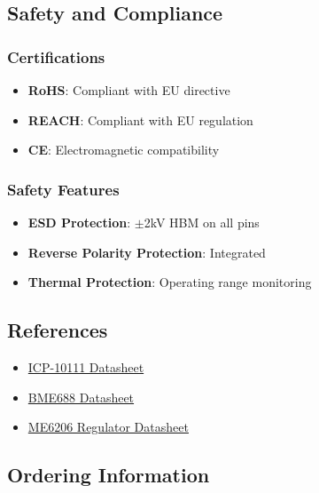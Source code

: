 \documentclass[11pt,a4paper]{article}
\begin{document}
\subsection{Safety and Compliance}

\subsubsection{Certifications}
\begin{itemize}
\item \textbf{RoHS}: Compliant with EU directive
\item \textbf{REACH}: Compliant with EU regulation
\item \textbf{CE}: Electromagnetic compatibility
\end{itemize}

\subsubsection{Safety Features}
\begin{itemize}
\item \textbf{ESD Protection}: $\pm$2kV HBM on all pins
\item \textbf{Reverse Polarity Protection}: Integrated
\item \textbf{Thermal Protection}: Operating range monitoring
\end{itemize}

\subsection{References}

\begin{itemize}
\item \href{https://product.tdk.com/system/files/dam/doc/product/sensor/pressure/capacitive-pressure/data_sheet/ds-000177-icp-10111-v1.3.pdf}{ICP-10111 Datasheet}
\item \href{https://www.bosch-sensortec.com/media/boschsensortec/downloads/datasheets/bst-bme688-ds000.pdf}{BME688 Datasheet}
\item \href{https://www.microne.com.cn/uploads/file/20200904/ME6206.pdf}{ME6206 Regulator Datasheet}
\end{itemize}

\subsection{Ordering Information}
\end{document}

